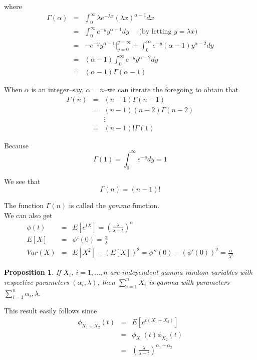 \documentclass[12pt]{article}
\newtheorem{proposition}[theorem]{Proposition}
\begin{document}
where
\begin{eqnarray*}
  \Gamma (\alpha)
  &=& \int_0^{\infty} \lambda e^{-\lambda x} (\lambda x)^{\alpha-1} dx \\
  &=& \int_0^{\infty} e^{-y} y^{\alpha - 1} dy \;\;\;\;\;
  \text{(by letting $y = \lambda x$)} \\
  &=& -e^{-y} y^{\alpha - 1} \Big |_{y=0}^{y=\infty}
  + \int_0^{\infty} e^{-y} (\alpha - 1) y^{\alpha - 2} dy \\
  &=& (\alpha - 1) \int_0^{\infty} e^{-y} y^{\alpha-2} dy \\
  &=& (\alpha - 1) \Gamma (\alpha -1)
\end{eqnarray*}

When $\alpha$ is an integer--say, $\alpha = n$--we can iterate the foregoing to obtain that
\begin{eqnarray*}
  \Gamma(n)
  &=& (n-1) \Gamma (n-1) \\
  &=& (n-1) (n-2) \Gamma (n-2) \\
  &&  \vdots \\
  &=& (n-1)!\Gamma (1)
\end{eqnarray*}

Because
\begin{equation*}
  \Gamma (1) = \int_0^{\infty} e^{-y} dy = 1
\end{equation*}

We see that
\begin{equation*}
  \Gamma (n) = (n-1)!
\end{equation*}

The function $\Gamma (n)$ is called the \emph{gamma} function. \\

We can also get
\begin{eqnarray*}
  \phi (t)
  &=& E[e^{tX}] = \left( \frac{\lambda}{\lambda - t} \right)^{\alpha} \\
  E[X]
  &=& \phi '(0) = \frac {\alpha}{\lambda} \\
  Var(X)
  &=& E[X^2] - (E[X])^2 = \phi ''(0) - \left( \phi '(0) \right)^2
  = \frac{\alpha}{\lambda^2}
\end{eqnarray*}

\begin{proposition}
  If $X_i$, $i=1,\dots,n$ are independent gamma random variables with respective parameters $(\alpha_i, \lambda)$, then $\sum_{i=1}^n X_i$ is gamma with parameters $\sum_{i=1}^n \alpha_i, \lambda$.
\end{proposition}

This result easily follows since
\begin{eqnarray*}
  \phi_{X_1+X_2} (t)
  &=& E[e^{t(X_1 + X_2)}] \\
  &=& \phi_{X_1} (t) \phi_{X_2} (t) \\
  &=& \left( \frac{\lambda}{\lambda - t} \right)^{\alpha_1 + \alpha_2}
\end{eqnarray*}
\end{document}
